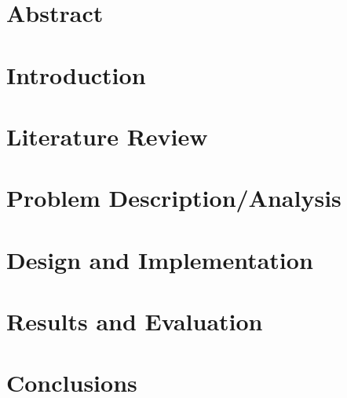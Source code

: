 \documentclass[a4paper, 11pt]{report}
\begin{document}

\chapter*{Abstract}

\tableofcontents
\chapter{Introduction}

\chapter{Literature Review}

\chapter{Problem Description/Analysis}

\chapter{Design and Implementation}

\chapter{Results and Evaluation}

\chapter{Conclusions}

{}


%
\end{document}

